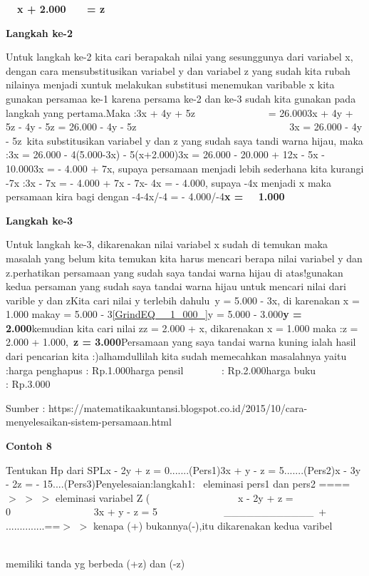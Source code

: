 \documentclass[11pt,fleqn]{book} %
\begin{document}
\noindent \textbf{~~x + 2.000~~~ = z}

\noindent \textbf{Langkah ke-2}

\noindent Untuk langkah ke-2 kita cari berapakah nilai yang sesunggunya dari variabel x, dengan cara mensubstitusikan variabel y dan variabel z yang sudah kita rubah nilainya menjadi xuntuk melakukan substitusi menemukan varibable x kita gunakan persamaa ke-1 karena persama ke-2 dan ke-3 sudah kita gunakan pada langkah yang pertama.Maka :3x + 4y + 5z~~~~~~~~~~~~~~ = 26.0003x + 4y + 5z - 4y - 5z = 26.000 - 4y - 5z~~~~~~~~~~~~~~~~~~~~~~~~~~~~~~ 3x = 26.000 - 4y - 5z~kita substitusikan variabel y dan z yang sudah saya tandi warna hijau, maka :3x = 26.000 - 4(5.000-3x) - 5(x+2.000)3x = 26.000 - 20.000 + 12x - 5x - 10.0003x = - 4.000 + 7x, supaya persamaan menjadi lebih sederhana kita kurangi -7x :3x - 7x = - 4.000 + 7x - 7x- 4x = - 4.000, supaya -4x menjadi x maka persamaan kira bagi dengan -4-4x/-4 = - 4.000/-4\textbf{x =~~ 1.000}

\noindent \textbf{Langkah ke-3}

\noindent Untuk langkah ke-3, dikarenakan nilai variabel x sudah di temukan maka masalah yang belum kita temukan kita harus mencari berapa nilai variabel y dan z.perhatikan persamaan yang sudah saya tandai warna hijau di atas!gunakan kedua persaman yang sudah saya tandai warna hijau untuk mencari nilai dari varible y dan zKita cari nilai y terlebih dahulu~y = 5.000 - 3x, di karenakan x = 1.000 makay = 5.000 - 3\eqref{GrindEQ__1_000_}y = 5.000 - 3.000\textbf{y = 2.000}kemudian kita cari nilai zz = 2.000 + x, dikarenakan x = 1.000 maka :z = 2.000 + 1.000,~\textbf{z = 3.000}Persamaan yang saya tandai warna kuning ialah hasil dari pencarian kita :)alhamdullilah kita sudah memecahkan masalahnya yaitu :harga penghapus : Rp.1.000harga pensil~~~~~~~ : Rp.2.000harga buku~~~~~~~~~ : Rp.3.000

\noindent Sumber : https://matematikaakuntansi.blogspot.co.id/2015/10/cara-menyelesaikan-sistem-persamaan.html

\noindent \textbf{Contoh 8}

\noindent Tentukan Hp dari SPLx - 2y + z = 0.......(Pers1)3x + y - z = 5.......(Pers2)x - 3y - 2z = - 15....(Pers3)Penyelesaian:langkah1:~ eleminasi pers1 dan pers2 ==== $>$ $>$ $>$ eleminasi variabel Z (~~~~~~~~~~~~~~~~~ x - 2y + z = 0~~~~~~~~~~~~~~~~ 3x + y - z = 5~ ~ ~ ~ ~ ~ ~ ~ \_\_\_\_\_\_\_\_\_\_\_\_~+ ~~ ..............==$>$ $>$ kenapa (+) bukannya(-),itu dikarenakan kedua varibel

\noindent ~~~~~~~~~~~~~~~~~~~~~~~~~~~~~~~~~~~~~~~~~~~~~~~~~~~~~~~~~~~~~~~~~~~~~~~ memiliki tanda yg berbeda (+z) dan (-z)
\end{document}
